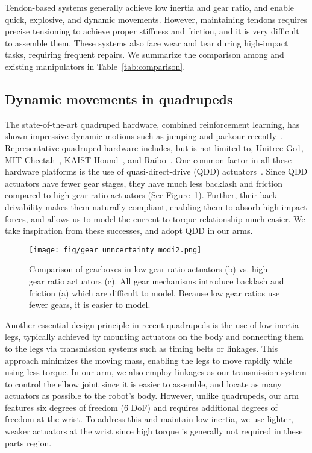 Tendon-based systems generally achieve low inertia and gear ratio, and enable quick, explosive, and dynamic movements. However, maintaining tendons requires precise tensioning to achieve proper stiffness and friction, and it is very difficult to assemble them. These systems also face wear and tear during high-impact tasks, requiring frequent repairs. We summarize the comparison among \robot and existing manipulators in Table~\ref{tab:comparison}.



\subsection{Dynamic movements in quadrupeds}
The state-of-the-art quadruped hardware, combined reinforcement learning, has shown impressive dynamic motions such as jumping and parkour recently~\cite{zhuang2023robot, cheng2024extreme, choi2023learning}. Representative quadruped hardware includes, but is not limited to, Unitree Go1, MIT Cheetah~\cite{bledt2018cheetah}, KAIST Hound~\cite{shin2022design}, and Raibo~\cite{choi2023learning}.
One common factor in all these hardware platforms is the use of quasi-direct-drive (QDD) actuators~\cite{wensing2017proprioceptive}. Since QDD actuators 
have fewer gear stages, they have much less backlash and friction compared to high-gear ratio actuators (See Figure~\ref{fig:gear_uncertainty}). Further, their back-drivability makes them naturally compliant, enabling them to absorb high-impact forces, and allows us to model the current-to-torque relationship much easier. We take inspiration from these successes, and adopt QDD in our arms.


\begin{figure}[ht]
\centering
\texttt{[image: fig/gear\_unncertainty\_modi2.png]}
\caption{Comparison of gearboxes in low-gear ratio actuators (b) vs. high-gear ratio actuators (c).  All gear mechanisms introduce backlash and friction (a) which are difficult to model. Because low gear ratios use fewer gears, it is easier to model.}
\label{fig:gear_uncertainty}
\end{figure}

Another essential design principle in recent quadrupeds is the use of low-inertia legs, typically achieved by mounting actuators on the body and connecting them to the legs via transmission systems such as timing belts or linkages. This approach minimizes the moving mass, enabling the legs to move rapidly while using less torque. In our arm, we also employ linkages as our transmission system to control the elbow joint since it is easier to assemble, and locate as many actuators as possible to the robot's body. However, unlike quadrupeds, our arm features six degrees of freedom (6 DoF) and requires additional degrees of freedom at the wrist. To address this and maintain low inertia, we use lighter, weaker actuators at the wrist since high torque is generally not required in these parts region.



